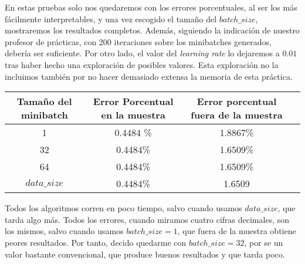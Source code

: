 \documentclass[11pt]{article}
\begin{document}
En estas pruebas solo nos quedaremos con los errores porcentuales, al ser los más fácilmente interpretables, y una vez escogido el tamaño del $batch\_size$, mostraremos los resultados completos. Además, siguiendo la indicación de nuestro profesor de prácticas, con 200 iteraciones sobre los minibatches generados, debería ser suficiente. Por otro lado, el valor del \emph{learning rate} lo dejaremos a $0.01$ tras haber hecho una exploración de posibles valores. Esta exploración no la incluimos también por no hacer demasiado extensa la memoria de esta práctica.

\begin{center}
    \begin{tabular}{| c | c | c | c |}
        Tamaño del minibatch & Error Porcentual en la muestra & Error porcentual fuera de la muestra \\
        \hline
        1 & 0.4484 \% & 1.8867\% \\
        32 & 0.4484\% & 1.6509\% \\
        64 & 0.4484\% & 1.6509\% \\
        $data\_size$ & 0.4484\% & 1.6509 \\
        \hline
    \end{tabular}
\end{center}

Todos los algoritmos corren en poco tiempo, salvo cuando usamos $data\_size$, que tarda algo más. Todos los errores, cuando miramos cuatro cifras decimales, son los mismos, salvo cuando usamos $batch\_size = 1$, que fuera de la muestra obtiene peores resultados. Por tanto, decido quedarme con $batch\_size = 32$, por se un valor bastante convencional, que produce buenos resultados y que tarda poco.
\end{document}
